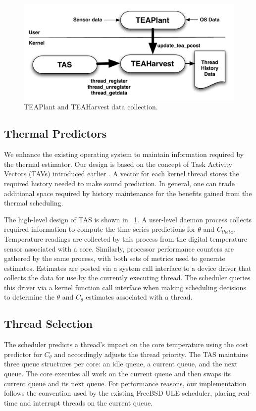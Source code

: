 \documentclass[times, 10pt,twocolumn]{IEEEtran}
\begin{document}
\begin{figure}[btph] \centering
  \includegraphics[scale=0.45]{tasdesign}
  \caption{TEAPlant and TEAHarvest data collection.}
  \label{fig:teaplant}
\end{figure}
\subsection{Thermal Predictors}
\label{sec:therm-pred-design} 
We enhance the existing operating system
to maintain information required by the thermal
estimator. Our design is based on the concept of Task Activity Vectors
(TAVs) introduced earlier \cite{Merkel2008a}.  A vector for each kernel
thread stores the required history needed to make sound prediction.
In general, one can trade additional space required by history maintenance
for the benefits gained from the thermal scheduling.

The high-level design of TAS is shown in \figurename~\ref{fig:teaplant}.
A user-level daemon process collects required information to compute
the time-series predictions for $\theta$ and $C_{theta}$. Temperature
readings are collected by this process from the digital temperature
sensor associated with a core.  Similarly, processor performance
counters are gathered by the same process, with both sets of metrics
used to generate estimates. Estimates are posted via a system call
interface to a device driver that collects the data for use by
the currently executing thread.  The scheduler queries this
driver via a kernel function call interface when making scheduling
decisions to determine the $\theta$ and $C_{\theta}$ estimates
associated with a thread.
\subsection{Thread Selection}
\label{sec:selection} 
The scheduler predicts a thread's impact on the
core temperature using the cost predictor for $C_{\theta}$
and accordingly adjusts the thread priority.  The TAS maintains three
queue structures per core: an idle queue, a current queue,
and the next queue. The core executes all work on the current
queue and then swaps its current queue and its next queue. For performance reasons,
our implementation follows the convention used by the existing
FreeBSD ULE scheduler, placing real-time and interrupt threads on the
current queue.
\end{document}
